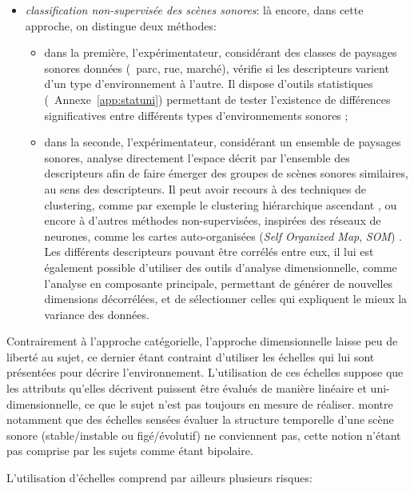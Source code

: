 \begin{itemize}
\item \emph{classification non-supervisée des scènes sonores}: là encore, dans cette approche, on distingue deux méthodes:

\begin{itemize}
\item dans la première, l'expérimentateur, considérant des classes de paysages sonores données (\eg~parc, rue, marché), vérifie si les descripteurs varient d'un type d'environnement à l'autre. Il dispose d'outils statistiques (\cf~Annexe~\ref{app:statuni}) permettant de tester l'existence de différences significatives entre différents types d'environnements sonores \citep{hong2013designing};
\item dans la seconde, l'expérimentateur, considérant un ensemble de paysages sonores, analyse directement l'espace décrit par l'ensemble des descripteurs afin de faire émerger des groupes de scènes sonores similaires, au sens des descripteurs. Il peut avoir recours à des techniques de clustering, comme par exemple le clustering hiérarchique ascendant \citep{torija2013application}, ou encore à d'autres méthodes non-supervisées, inspirées des réseaux de neurones, comme les cartes auto-organisées (\emph{Self Organized Map}, \emph{SOM}) \citep{ricciardi2015sound}. Les différents descripteurs pouvant être corrélés entre eux, il lui est également possible d'utiliser des outils d'analyse dimensionnelle, comme l'analyse en composante principale, permettant de générer de nouvelles dimensions décorrélées, et de sélectionner celles qui expliquent le mieux la variance des données.
\end{itemize}

\end{itemize}

Contrairement à l'approche catégorielle, l'approche dimensionnelle laisse peu de liberté au sujet, ce dernier étant contraint d'utiliser les échelles qui lui sont présentées pour décrire l'environnement. L'utilisation de ces échelles suppose que les attributs qu'elles décrivent puissent être évalués de manière linéaire et uni-dimensionnelle, ce que le sujet n'est pas toujours en mesure de réaliser. \citep{raimbault2006qualitative} montre notamment que des échelles sensées évaluer la structure temporelle d'une scène sonore (stable/instable ou figé/évolutif) ne conviennent pas, cette notion n'étant pas comprise par les sujets comme étant bipolaire.

L'utilisation d'échelles comprend par ailleurs plusieurs risques:

